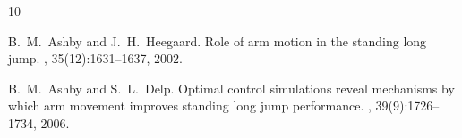 \documentclass{article}
\begin{document}
\begin{thebibliography}{10}

B.~M.~Ashby and J.~H.~Heegaard.
\newblock Role of arm motion in the standing long jump.
, 35(12):1631--1637, 2002.

B.~M.~Ashby and S.~L.~Delp.
\newblock Optimal control simulations reveal mechanisms by which arm movement
  improves standing long jump performance.
, 39(9):1726--1734, 2006.

\end{thebibliography}
\end{document}
